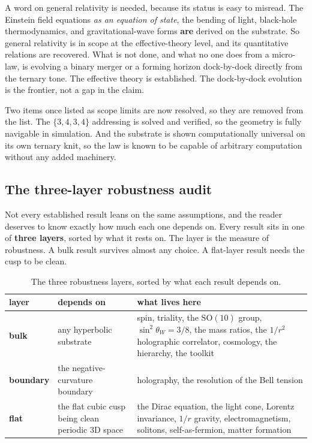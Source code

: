 A word on general relativity is needed, because its status is easy to misread. The Einstein field equations \emph{as an equation of state}, the bending of light, black-hole thermodynamics, and gravitational-wave forms \textbf{are} derived on the substrate. So general relativity is in scope at the effective-theory level, and its quantitative relations are recovered. What is not done, and what no one does from a micro-law, is evolving a binary merger or a forming horizon dock-by-dock directly from the ternary tone. The effective theory is established. The dock-by-dock evolution is the frontier, not a gap in the claim.

Two items once listed as scope limits are now resolved, so they are removed from the list. The $\{3,4,3,4\}$ addressing is solved and verified, so the geometry is fully navigable in simulation. And the substrate is shown computationally universal on its own ternary knit, so the law is known to be capable of arbitrary computation without any added machinery.

\subsection{The three-layer robustness audit}

Not every established result leans on the same assumptions, and the reader deserves to know exactly how much each one depends on. Every result sits in one of \textbf{three layers}, sorted by what it rests on. The layer is the measure of robustness. A bulk result survives almost any choice. A flat-layer result needs the cusp to be clean.

\begin{table}[ht]
\centering
\begin{tabular}{@{}p{}p{}p{}@{}}
\toprule
layer & depends on & what lives here \\
\midrule
\textbf{bulk} & any hyperbolic substrate & spin, triality, the $\mathrm{SO}(10)$ group, $\sin^2\theta_W = 3/8$, the mass ratios, the $1/r^2$ holographic correlator, cosmology, the hierarchy, the toolkit \\
\textbf{boundary} & the negative-curvature boundary & holography, the resolution of the Bell tension \\
\textbf{flat} & the flat cubic cusp being clean periodic 3D space & the Dirac equation, the light cone, Lorentz invariance, $1/r$ gravity, electromagnetism, solitons, self-as-fermion, matter formation \\
\bottomrule
\end{tabular}
\caption{The three robustness layers, sorted by what each result depends on.}
\label{tab:robustness-layers}
\end{table}

